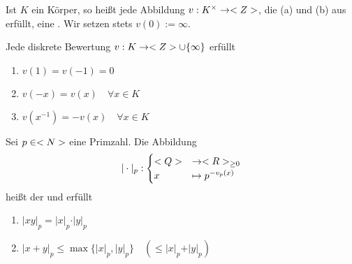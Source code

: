 \begin{definition}
	Ist $K$ ein Körper, so heißt jede Abbildung $v: K^{\times} \to <Z>$, die (a) und (b) aus  erfüllt, eine . Wir setzen stets $v(0) := \infty$.
\end{definition}

\begin{remark}
	Jede diskrete Bewertung $v: K \to <Z> \cup \{\infty\}$ erfüllt
	\begin{enumerate}[label=(\alph*)]
		\item $v(1) = v(-1) = 0$
		\item $v(-x) = v(x) \quad \forall x \in K$
		\item $v(x^{-1}) = -v(x) \quad \forall x \in K$
	\end{enumerate}
\end{remark}

\begin{definition}
	Sei $p \in <N>$ eine Primzahl. Die Abbildung
	\begin{align}
	\vert \cdot \vert_p: \begin{cases}
	<Q> &\to <R>_{\ge 0} \\
	x &\mapsto p^{-v_p(x)} \notag
	\end{cases}
	\end{align}
	heißt der  und erfüllt
	\begin{enumerate}[label=(\alph*)]
		\item $\vert xy\vert_p = \vert x \vert_p \cdot \vert y\vert_p$
		\item $\vert x+y\vert_p \le \max\{\vert x\vert_p, \vert y\vert_p\}\quad (\le \vert x\vert_p + \vert y\vert_p)$
	\end{enumerate}
\end{definition}